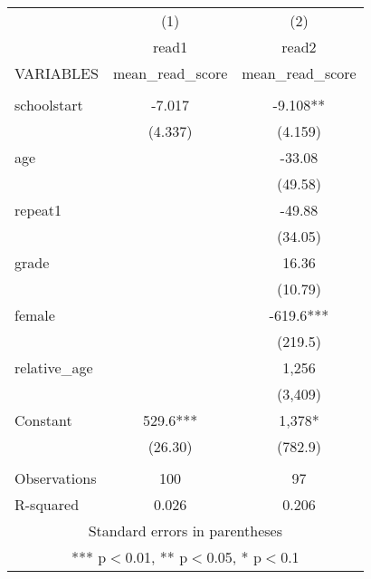 \documentclass[]{article}
\begin{document}
\begin{tabular}{lcc} \hline
 & (1) & (2) \\
 & read1 & read2 \\
VARIABLES & mean\_read\_score & mean\_read\_score \\ \hline
 &  &  \\
schoolstart & -7.017 & -9.108** \\
 & (4.337) & (4.159) \\
age &  & -33.08 \\
 &  & (49.58) \\
repeat1 &  & -49.88 \\
 &  & (34.05) \\
grade &  & 16.36 \\
 &  & (10.79) \\
female &  & -619.6*** \\
 &  & (219.5) \\
relative\_age &  & 1,256 \\
 &  & (3,409) \\
Constant & 529.6*** & 1,378* \\
 & (26.30) & (782.9) \\
 &  &  \\
Observations & 100 & 97 \\
 R-squared & 0.026 & 0.206 \\ \hline
\multicolumn{3}{c}{ Standard errors in parentheses} \\
\multicolumn{3}{c}{ *** p$<$0.01, ** p$<$0.05, * p$<$0.1} \\
\end{tabular}
\end{document}
